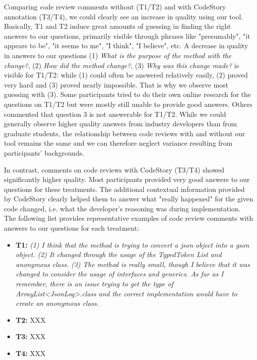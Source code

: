 \documentclass[../manifest.tex]{subfiles}
\begin{document}
Comparing code review comments without (T1/T2) and with CodeStory annotation (T3/T4), we could clearly see an increase in quality using our tool. Basically, T1 and T2 induce great amounts of guessing in finding the right answers to our questions, primarily visible through phrases like "presumably", "it appears to be", "it seems to me", "I think", "I believe", etc. A decrease in quality in answers to our questions (1) \textit{What is the purpose of the method with the change?}, (2) \textit{How did the method change?}, (3) \textit{Why was this change made?} is visible for T1/T2: while (1) could often be answered relatively easily, (2) proved very hard and (3) proved nearly impossible. That is why we observe most guessing with (3). Some participants tried to do their own online research for the questions on T1/T2 but were mostly still unable to provide good answers. Others commented that question 3 is not answerable for T1/T2. While we could generally observe higher quality answers from industry developers than from graduate students, the relationship between code reviews with and without our tool remains the same and we can therefore neglect variance resulting from participants' backgrounds.

In contrast, comments on code reviews with CodeStory (T3/T4) showed significantly higher quality. Most participants provided very good answers to our questions for these treatments. The additional contextual information provided by CodeStory clearly helped them to answer what "really happened" for the given code changed, i.e. what the developer's reasoning was during implementation. The following list provides representative examples of code review comments with answers to our questions for each treatment:

\begin{itemize}
  \item \textbf{T1:}
\textit{(1) I think that the method is trying to convert a json object into a gson object.
(2) It changed through the usage of the TypedToken List and anonymous class.
(3) The method is really small, though I believe that it was changed to consider the usage of interfaces and generics. As far as I remember, there is an issue trying to get the type of  ArrayList<JsonLog>.class and the correct implementation would have to create an anonymous class.}
  \item \textbf{T2:} XXX
  \item \textbf{T3:} XXX
  \item \textbf{T4:} XXX
\end{itemize}
\end{document}
